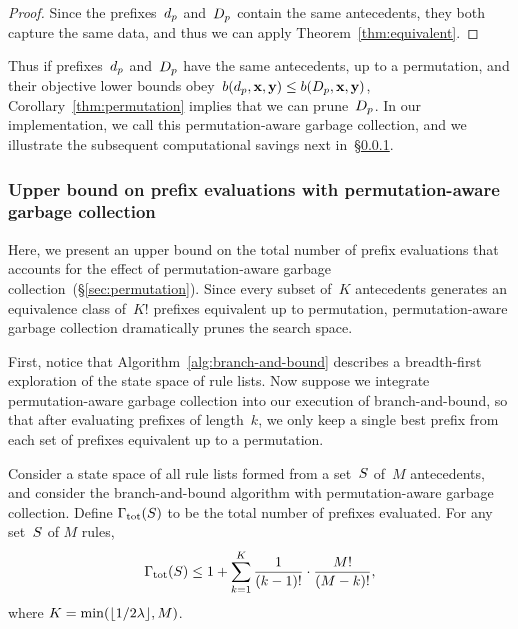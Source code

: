 \begin{proof}
Since the prefixes~$d_p$ and~$D_p$ contain
the same antecedents, they both capture the same data,
and thus we can apply Theorem~\ref{thm:equivalent}.
\end{proof}

Thus if prefixes~$d_p$ and~$D_p$ have the same antecedents,
up to a permutation, and their objective lower bounds
obey~${b(d_p, \mathbf{x}, \mathbf{y}) \le b(D_p, \mathbf{x}, \mathbf{y})}$,
Corollary~\ref{thm:permutation} implies that we can prune~$D_p$.
%
In our implementation, we call this permutation-aware
garbage collection, and we illustrate the subsequent
computational savings next in~\S\ref{sec:permutation-counting}.

\subsubsection{Upper bound on prefix evaluations with permutation-aware garbage collection}
\label{sec:permutation-counting}

Here, we present an upper bound on the total number of prefix
evaluations that accounts for the effect of permutation-aware
garbage collection~(\S\ref{sec:permutation}).
%
Since every subset of~$K$ antecedents generates an equivalence
class of~$K!$ prefixes equivalent up to permutation, permutation-aware
garbage collection dramatically prunes the search space.

First, notice that Algorithm~\ref{alg:branch-and-bound} describes a
breadth-first exploration of the state space of rule lists.
%
Now suppose we integrate permutation-aware garbage collection into
our execution of branch-and-bound, so that after evaluating
prefixes of length~$k$, we only keep a single best prefix
from each set of prefixes equivalent up to a permutation.

\begin{theorem}
%
Consider a state space of all rule lists formed from a set~$S$
of~$M$ antecedents, and consider the branch-and-bound algorithm with
permutation-aware garbage collection.
%
Define ${\Gamma_{\textnormal{tot}}}(S)$ to be the total number of prefixes evaluated.
%
For any set~$S$ of $M$ rules,
\begin{align}
\TotalRemaining(\RuleSet)
\le  1 + \sum_{k=1}^K \frac{1}{(k - 1)!} \cdot \frac{M!}{(M - k)!},
\end{align}
where ${K = \min(\lfloor 1 / 2 {\lambda} \rfloor, M)}$.
\end{theorem}

